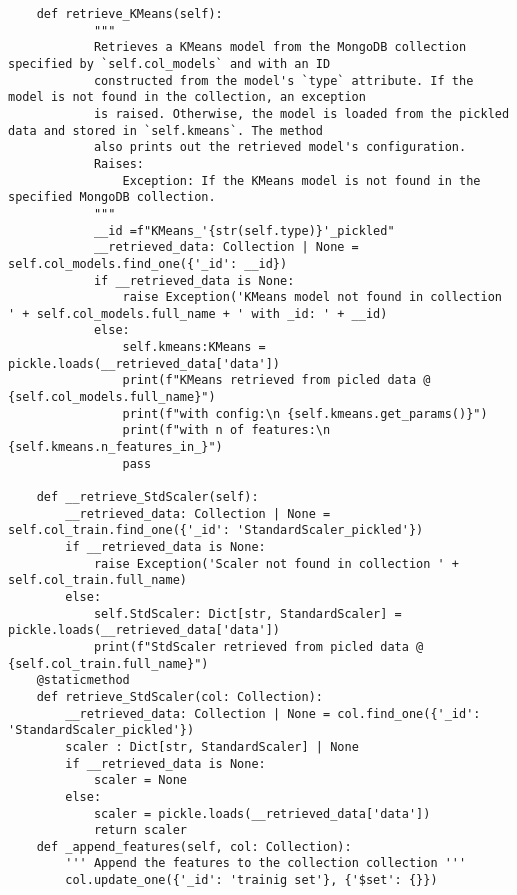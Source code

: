 \begin{verbatim}
    def retrieve_KMeans(self):
            """
            Retrieves a KMeans model from the MongoDB collection specified by `self.col_models` and with an ID
            constructed from the model's `type` attribute. If the model is not found in the collection, an exception
            is raised. Otherwise, the model is loaded from the pickled data and stored in `self.kmeans`. The method
            also prints out the retrieved model's configuration.
            Raises:
                Exception: If the KMeans model is not found in the specified MongoDB collection.
            """
            __id =f"KMeans_'{str(self.type)}'_pickled"
            __retrieved_data: Collection | None = self.col_models.find_one({'_id': __id})
            if __retrieved_data is None:
                raise Exception('KMeans model not found in collection ' + self.col_models.full_name + ' with _id: ' + __id)
            else:
                self.kmeans:KMeans = pickle.loads(__retrieved_data['data'])
                print(f"KMeans retrieved from picled data @ {self.col_models.full_name}")
                print(f"with config:\n {self.kmeans.get_params()}")
                print(f"with n of features:\n {self.kmeans.n_features_in_}")
                pass
    
    def __retrieve_StdScaler(self):
        __retrieved_data: Collection | None = self.col_train.find_one({'_id': 'StandardScaler_pickled'})
        if __retrieved_data is None:
            raise Exception('Scaler not found in collection ' + self.col_train.full_name)
        else:
            self.StdScaler: Dict[str, StandardScaler] = pickle.loads(__retrieved_data['data'])
            print(f"StdScaler retrieved from picled data @ {self.col_train.full_name}")
    @staticmethod
    def retrieve_StdScaler(col: Collection):
        __retrieved_data: Collection | None = col.find_one({'_id': 'StandardScaler_pickled'})
        scaler : Dict[str, StandardScaler] | None
        if __retrieved_data is None:
            scaler = None
        else:
            scaler = pickle.loads(__retrieved_data['data'])
            return scaler
    def _append_features(self, col: Collection):
        ''' Append the features to the collection collection '''
        col.update_one({'_id': 'trainig set'}, {'$set': {}})
    

\end{verbatim}
